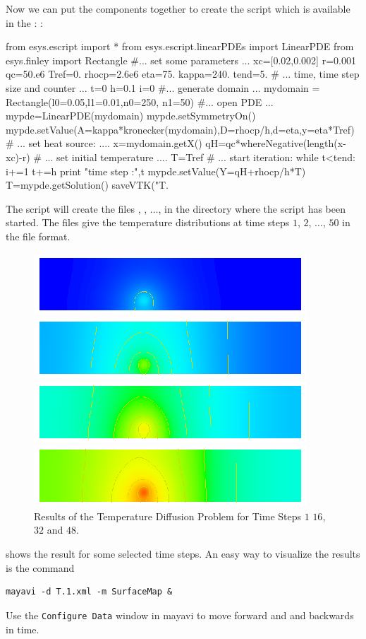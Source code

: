 Now we can put the components together to create the script  which is available in the \ExampleDirectory:
:
\begin{python}
from esys.escript import *
from esys.escript.linearPDEs import LinearPDE
from esys.finley import Rectangle
#... set some parameters ...
xc=[0.02,0.002]
r=0.001
qc=50.e6
Tref=0.
rhocp=2.6e6
eta=75.
kappa=240.
tend=5.
# ... time, time step size and counter ...
t=0
h=0.1
i=0
#... generate domain ...
mydomain = Rectangle(l0=0.05,l1=0.01,n0=250, n1=50)
#... open PDE ...
mypde=LinearPDE(mydomain)
mypde.setSymmetryOn()
mypde.setValue(A=kappa*kronecker(mydomain),D=rhocp/h,d=eta,y=eta*Tref)
# ... set heat source: ....
x=mydomain.getX()
qH=qc*whereNegative(length(x-xc)-r)
# ... set initial temperature ....
T=Tref
# ... start iteration:
while t<tend:
      i+=1
      t+=h
      print "time step :",t
      mypde.setValue(Y=qH+rhocp/h*T)
      T=mypde.getSolution()
      saveVTK("T.%
\end{python}
The script will create the files ,
 , $\ldots$,  in the directory where the script has been started. The files give the 
temperature distributions at time steps $1$, $2$, $\ldots$, $50$ in the \VTK file format. 

\begin{figure}
\centerline{\includegraphics[width=\figwidth]{figures/DiffusionRes1.eps}}
\centerline{\includegraphics[width=\figwidth]{figures/DiffusionRes16.eps}}
\centerline{\includegraphics[width=\figwidth]{figures/DiffusionRes32.eps}}
\centerline{\includegraphics[width=\figwidth]{figures/DiffusionRes48.eps}}
\caption{Results of the Temperature Diffusion Problem for Time Steps $1$ $16$, $32$ and $48$.}
\label{DIFFUSION FIG 2}
\end{figure}
 shows the result for some selected time steps.
An easy way to visualize the results is the command
\begin{verbatim}
mayavi -d T.1.xml -m SurfaceMap &
\end{verbatim}
Use the \texttt{Configure Data} window in mayavi
to move forward and and backwards in time. 
